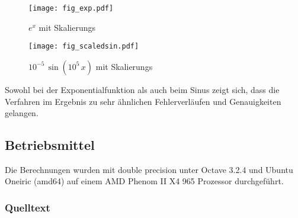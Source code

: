 \documentclass{scrartcl}
\begin{document}
\begin{figure}[!htb]
\centering
\texttt{[image: fig\_exp.pdf]}
\caption{\(e^x\) mit Skalierungs}
\label{fig:exp_s}
\end{figure}

\begin{figure}[!htb]
\centering
\texttt{[image: fig\_scaledsin.pdf]}
\caption{\(10^{-5}\, \sin(10^5\, x)\) mit Skalierungs}
\label{fig:sin_s}
\end{figure}

Sowohl bei der Exponentialfunktion als auch beim Sinus zeigt sich, dass die Verfahren im Ergebnis zu sehr ähnlichen Fehlerverläufen und Genauigkeiten gelangen.


\subsection{Betriebsmittel}

Die Berechnungen wurden mit double precision unter Octave 3.2.4 und Ubuntu
Oneiric (amd64) auf einem AMD Phenom II X4 965 Prozessor durchgeführt.

\subsubsection{Quelltext}


\end{document}
